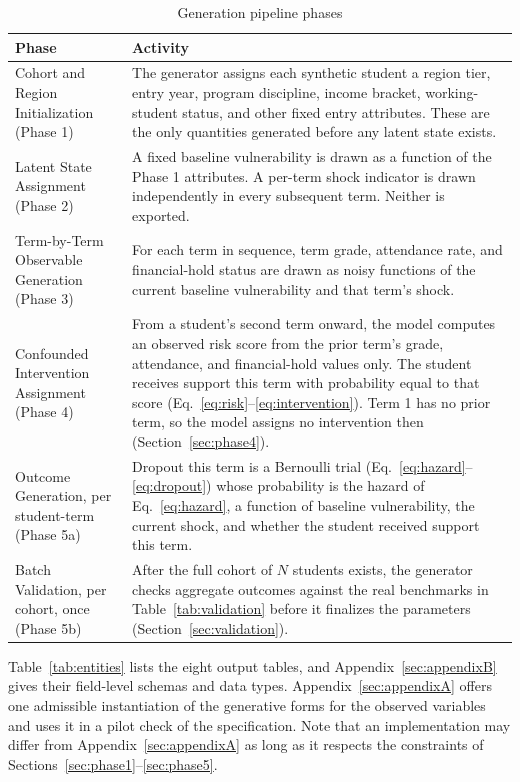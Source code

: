 \documentclass[11pt]{article}
\begin{document}
\begin{table}[htbp]
\caption{Generation pipeline phases}
\label{tab:phases}
\centering
\small
\renewcommand{\arraystretch}{1.2}
\begin{tabular}{@{}p{}p{}@{}}
\toprule
\textbf{Phase} & \textbf{Activity} \\
\midrule
Cohort and Region Initialization (Phase 1) & The generator assigns each synthetic student a region tier, entry year, program discipline, income bracket, working-student status, and other fixed entry attributes. These are the only quantities generated before any latent state exists. \\
\addlinespace
Latent State Assignment (Phase 2) & A fixed baseline vulnerability is drawn as a function of the Phase 1 attributes. A per-term shock indicator is drawn independently in every subsequent term. Neither is exported. \\
\addlinespace
Term-by-Term Observable Generation (Phase 3) & For each term in sequence, term grade, attendance rate, and financial-hold status are drawn as noisy functions of the current baseline vulnerability and that term's shock. \\
\addlinespace
Confounded Intervention Assignment (Phase 4) & From a student's second term onward, the model computes an observed risk score from the prior term's grade, attendance, and financial-hold values only. The student receives support this term with probability equal to that score (Eq.~\ref{eq:risk}--\ref{eq:intervention}). Term 1 has no prior term, so the model assigns no intervention then (Section~\ref{sec:phase4}). \\
\addlinespace
Outcome Generation, per student-term (Phase 5a) & Dropout this term is a Bernoulli trial (Eq.~\ref{eq:hazard}--\ref{eq:dropout}) whose probability is the hazard of Eq.~\ref{eq:hazard}, a function of baseline vulnerability, the current shock, and whether the student received support this term. \\
\addlinespace
Batch Validation, per cohort, once (Phase 5b) & After the full cohort of $N$ students exists, the generator checks aggregate outcomes against the real benchmarks in Table~\ref{tab:validation} before it finalizes the parameters (Section~\ref{sec:validation}). \\
\bottomrule
\end{tabular}
\end{table}

Table~\ref{tab:entities} lists the eight output tables, and Appendix~\ref{sec:appendixB} gives their field-level schemas and data types. Appendix~\ref{sec:appendixA} offers one admissible instantiation of the generative forms for the observed variables and uses it in a pilot check of the specification. Note that an implementation may differ from Appendix~\ref{sec:appendixA} as long as it respects the constraints of Sections~\ref{sec:phase1}--\ref{sec:phase5}.
\end{document}
